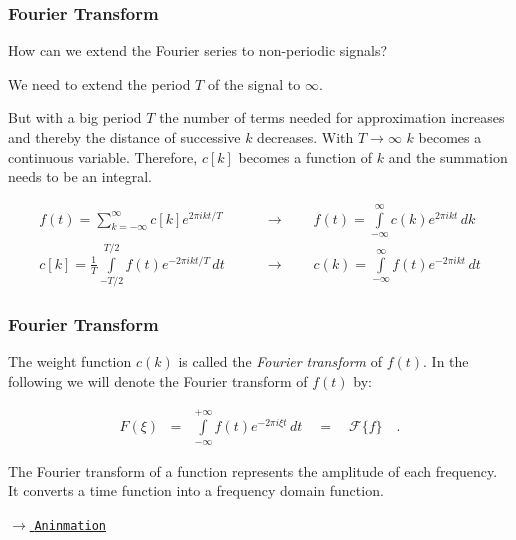 \begin{frame}
    \frametitle{Fourier Transform}
    \question How can we extend the Fourier series to non-periodic signals?\newline

    \answer We need to extend the period $T$ of the signal to $\infty$.\newline

    But with a big period $T$ the number of terms needed for approximation increases and thereby the distance of successive $k$ decreases. With $T\rightarrow\infty$ $k$ becomes a continuous variable. Therefore, $c[k]$ becomes a function of $k$ and the summation needs to be an integral.

        {
            \begin{align*}
                f(t) = \sum\limits_{k=-\infty}^{\infty} c[k] e^{2\pi ikt/T} \quad\quad            & \rightarrow \quad\quad f(t) = \int\limits_{-\infty}^{\infty} c(k) e^{2\pi ikt}\, dk  \\
                c[k] = \frac{1}{T}\int\limits_{-T/2}^{T/2} f(t) e^{-2\pi ikt/T}\, dt \quad\quad & \rightarrow \quad\quad c(k) = \int\limits_{-\infty}^{\infty} f(t) e^{-2\pi ikt}\, dt
            \end{align*}
        }
\end{frame}



\begin{frame}
    \frametitle{Fourier Transform}

    \begin{myDefinition}

        The weight function $c(k)$ is called the \textit{Fourier transform} of $f(t)$. In the following we will denote the Fourier transform of $f(t)$ by:

        \begin{eqnarray*}
            F(\xi)&=& \int\limits_{-\infty}^{+\infty} f(t) e^{-2\pi i\xi t} \, dt\quad =
            \quad  \mathcal{F}\{f\}\quad .
        \end{eqnarray*}

        The Fourier transform of a function represents the amplitude of each frequency. It converts a time function into a frequency domain function.

    \end{myDefinition}
    \vspace{1cm}

    \begin{flushright}
        \href{https://upload.wikimedia.org/wikipedia/commons/a/a3/Continuous_Fourier_transform_of_rect_and_sinc_functions.gif}{$\longrightarrow$ \texttt{Aninmation}}
    \end{flushright}

\end{frame}




